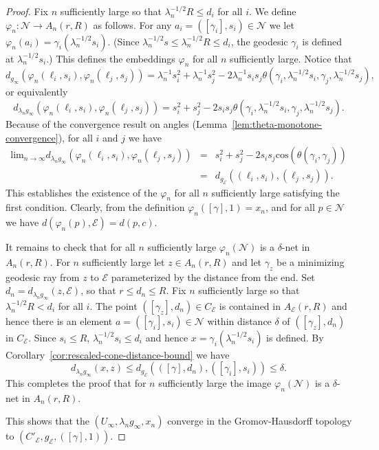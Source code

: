 \begin{proof}
Fix $n$ sufficiently large so that $\lambda_n^{-1/2}R\le d_i$ for all $i$. We
define $\varphi_n\colon {\mathcal N}\to A_n(r,R)$ as follows. For any
$a_i=([\gamma_i],s_i)\in {\mathcal N}$ we let
$\varphi_n(a_i)=\gamma_i(\lambda_n^{-1/2}s_i)$. (Since $\lambda_n^{-1/2}s\le
\lambda_n^{-1/2}R\le d_i$, the geodesic $\gamma_i$ is defined at
$\lambda_n^{-1/2}s_i$.) This defines the embeddings $\varphi_n$ for all $n$
sufficiently large. Notice that
$$d_{g_\infty}\left(\varphi_n(\ell_i,s_i),\varphi_n(\ell_j,s_j)\right)=\lambda_n^{-1}s_i^2+\lambda_n^{-1}
s_j^2-2\lambda_n^{-1}s_is_j\theta(\gamma_i,\lambda_n^{-1/2}s_i,\gamma_j,\lambda_n^{-1/2}s_j),$$
or equivalently
$$d_{\lambda_ng_\infty}\left(\varphi_n(\ell_i,s_i),\varphi_n(\ell_j,s_j)\right)=s_i^2+s_j^2-2s_is_j
\theta(\gamma_i,\lambda_n^{-1/2}s_i,\gamma_j,\lambda_n^{-1/2}s_j).$$
Because of the convergence result on angles (Lemma~\ref{lem:theta-monotone-convergence}),
for all $i$ and $j$ we have \begin{eqnarray*} \mathrm{lim}_{n\rightarrow\infty}d_{\lambda_ng_\infty}\left(\varphi_n(\ell_i,s_i),\varphi_n(\ell_j,s_j)\right)
 & = & s_i^2+s_j^2-2s_is_j\mathrm{cos}(\theta(\gamma_i,\gamma_j)) \\ & = & d_{g_{\mathcal
E}}\left((\ell_i,s_i),(\ell_j,s_j)\right).\end{eqnarray*}
 This
establishes the existence of the $\varphi_n$ for all $n$
sufficiently large satisfying the first condition. Clearly, from the
definition $\varphi_n([\gamma],1)=x_n$, and for all $p\in {\mathcal
N}$ we have $d(\varphi_n(p),{\mathcal E})=d(p,c)$.

It remains to check that for all $n$ sufficiently large
$\varphi_n({\mathcal N})$ is a $\delta$-net in $A_n(r,R)$. For $n$
sufficiently large let $z\in A_n(r,R)$ and let $\gamma_z$ be a
minimizing geodesic ray from $z$ to ${\mathcal E}$ parameterized by
the distance from the end. Set
$d_n=d_{\lambda_ng_\infty}(z,{\mathcal E})$, so that $r\le d_n\le
R$. Fix $n$ sufficiently large so that $\lambda_n^{-1/2}R<d_i$ for
all $i$. The point $([\gamma_z],d_n)\in C_{\mathcal E}$ is contained
in $A_{\mathcal E}(r,R)$ and hence there is an element
$a=([\gamma_i],s_i)\in {\mathcal N}$ within distance $\delta$ of
$([\gamma_z],d_n)$ in $C_{\mathcal E}$. Since $s_i\le R$,
$\lambda_n^{-1/2}s_i\le d_i$ and hence
$x=\gamma_i(\lambda_n^{-1/2}s_i)$ is defined. By
Corollary~\ref{cor:rescaled-cone-distance-bound} we have
$$d_{\lambda_ng_\infty}(x,z)\le
d_{g_{\mathcal E}}\left(([\gamma],d_n),([\gamma_i],s_i)\right)\le
\delta.$$ This completes the proof that for $n$ sufficiently large
the image $\varphi_n({\mathcal N})$ is a $\delta$-net in $A_n(r,R)$.

This shows that the $(U_\infty,\lambda_ng_\infty,x_n)$ converge in
the Gromov-Hausdorff topology to $(C'_{\mathcal E},g_{\mathcal
E},([\gamma],1))$.
\end{proof}

